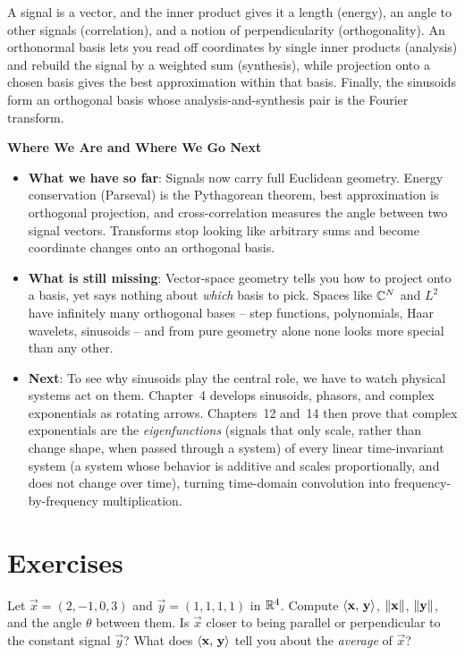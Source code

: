 A signal is a vector, and the inner product gives it a length
(energy), an angle to other signals (correlation), and a notion of perpendicularity (orthogonality).
An orthonormal basis lets you read off coordinates by single inner products (analysis) and rebuild the
signal by a weighted sum (synthesis), while projection onto a chosen basis gives the best approximation within
that basis. Finally, the sinusoids form an orthogonal basis whose analysis-and-synthesis pair is the Fourier
transform.

\begin{connectionbox}
\textbf{Where We Are and Where We Go Next}
\begin{itemize}
  \item \textbf{What we have so far}: Signals now carry full Euclidean geometry. Energy conservation
  (Parseval) is the Pythagorean theorem, best approximation is orthogonal projection, and
  cross-correlation measures the angle between two signal vectors. Transforms stop looking like
  arbitrary sums and become coordinate changes onto an orthogonal basis.
  \item \textbf{What is still missing}: Vector-space geometry tells you how to project onto a basis,
  yet says nothing about \emph{which} basis to pick. Spaces like $\mathbb{C}^N$ and $L^2$ have infinitely
  many orthogonal bases -- step functions, polynomials, Haar wavelets, sinusoids -- and from pure
  geometry alone none looks more special than any other.
  \item \textbf{Next}: To see why sinusoids play the central role, we have to watch physical systems act
  on them. Chapter~4 develops sinusoids, phasors, and complex exponentials as rotating arrows.
  Chapters~12 and~14 then prove that complex exponentials are the \emph{eigenfunctions} (signals that only scale, rather than change shape, when passed through a system) of every
  linear time-invariant system (a system whose behavior is additive and scales proportionally, and does not change over time), turning time-domain convolution into frequency-by-frequency
  multiplication.
\end{itemize}
\end{connectionbox}

\section{Exercises}
\label{ch03:exercises}

\begin{exercise}
Let $\vec{x}=(2,-1,0,3)$ and $\vec{y}=(1,1,1,1)$ in $\mathbb{R}^4$. Compute $\langle \mathbf{x},\, \mathbf{y} \rangle$,
$\lVert\mathbf{x}\rVert$, $\lVert\mathbf{y}\rVert$, and the angle $\theta$ between them. Is $\vec{x}$ closer to being
parallel or perpendicular to the constant signal $\vec{y}$? What does $\langle \mathbf{x},\, \mathbf{y} \rangle$ tell
you about the \emph{average} of $\vec{x}$?
\end{exercise}


